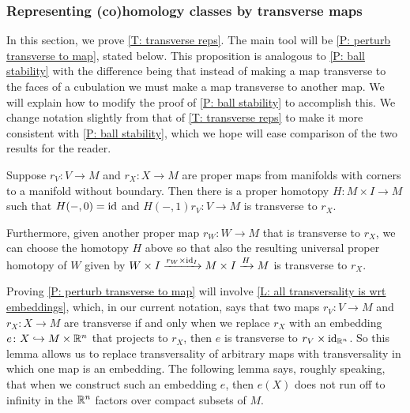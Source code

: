 \begin{comment}
NEED TO PULL THIS OUT

The arguments of the proof of \cref{T: (co)homology products} also demonstrate the following important theorem:



\greg{Once this section is edited and fixed up, we need to pull out a theorem that says that given $W$, (1) any cocycle can be represented by a pre(co)chain $V$ transverse to $W$ and (2) given such a cocycle transverse to $W$ that bounds, we can cobound it with something transverse to $W$. For sketch of proof, see comment after this note marker
}
\end{comment}


\subsubsection{Representing (co)homology classes by transverse maps}\label{S: transverse maps}

In this section, we prove \cref{T: transverse reps}.
The main tool will be \cref{P: perturb transverse to map}, stated below.
This proposition is analogous to \cref{P: ball stability} with the difference being that instead of making a map transverse to the faces of a cubulation we must make a map transverse to another map.
We will explain how to modify the proof of \cref{P: ball stability} to accomplish this.
We change notation slightly from that of \cref{T: transverse reps} to make it more consistent with \cref{P: ball stability}, which we hope will ease comparison of the two results for the reader.

\begin{proposition}\label{P: perturb transverse to map}
	Suppose $r_V \colon V \to M$ and $r_X \colon X \to M$ are proper maps from manifolds with corners to a manifold without boundary.
	Then there is a proper homotopy $H \colon M \times I \to M$ such that $H(-,0) = \mathrm{id}$ and $H(-,1)r_V \colon V \to M$ is transverse to $r_X$.

	Furthermore, given another proper map $r_W \colon W \to M$ that is transverse to $r_X$, we can choose the homotopy $H$ above so that also the resulting universal proper homotopy of $W$ given by $W \times I \xrightarrow{r_W \times \mathrm{id}_I} M \times I \xrightarrow{H} M$ is transverse to $r_X$.
\end{proposition}

Proving \cref{P: perturb transverse to map} will involve \cref{L: all transversality is wrt embeddings}, which, in our current notation, says that two maps $r_V \colon V \to M$ and $r_X \colon X \to M$ are transverse if and only when we replace $r_X$ with an embedding $e \colon X \hookrightarrow M \times \mathbb{R}^n$ that projects to $r_X$, then $e$ is transverse to $r_V \times \mathrm{id}_{\mathbb{R}^n}$.
So this lemma allows us to replace transversality of arbitrary maps with transversality in which one map is an embedding.
The following lemma says, roughly speaking, that when we construct such an embedding $e$, then $e(X)$ does not run off to infinity in the $\mathbb{R}^n$ factors over compact subsets of $M$.

